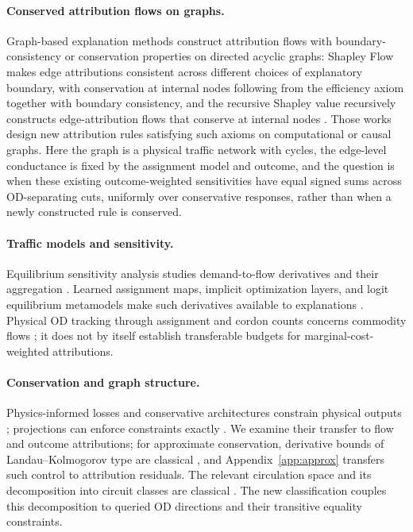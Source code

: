 \documentclass[a4paper,fleqn]{cas-sc}
\begin{document}
\paragraph{Conserved attribution flows on graphs.}
Graph-based explanation methods construct attribution flows with
boundary-consistency or conservation properties on directed acyclic
graphs: Shapley Flow makes edge attributions consistent across
different choices of explanatory boundary, with conservation at
internal nodes following from the efficiency axiom together with
boundary consistency, and the recursive
Shapley value recursively constructs edge-attribution flows that
conserve at internal nodes \citep{wang2021shapleyflow,singal2021rsv}.
Those works design
new attribution rules satisfying such axioms on computational or causal
graphs. Here the graph is a physical traffic network with cycles, the
edge-level conductance is fixed by the assignment model and outcome,
and the question is when these existing outcome-weighted sensitivities
have equal signed sums across OD-separating cuts, uniformly over
conservative responses, rather than when a newly constructed rule is
conserved.

\paragraph{Traffic models and sensitivity.}
Equilibrium sensitivity analysis studies demand-to-flow derivatives and their
aggregation \citep{tobin1988sensitivity,yang2005sensitivity,josefsson2007sensitivity,patriksson2003aggregated}.
Learned assignment maps, implicit optimization layers, and logit equilibrium
metamodels make such derivatives available to explanations
\citep{liu2023endtoend,amos2017optnet,lassen2025learning}.
Physical OD tracking through assignment and cordon counts concerns commodity
flows \citep{sheffi1985urban,vanzuylen1980most,bar2002origin}; it does not by
itself establish transferable budgets for marginal-cost-weighted attributions.

\paragraph{Conservation and graph structure.}
Physics-informed losses and conservative architectures constrain physical
outputs \citep{raissi2019physics,shi2021physics,richterpowell2022neural};
projections can enforce constraints exactly \citep{valente2025physics,baez2024guaranteeing}.
We examine their transfer to flow and outcome attributions; for
approximate conservation, derivative bounds of Landau--Kolmogorov type
are classical \citep{shadrin2014landau}, and
Appendix~\ref{app:approx} transfers such control to attribution
residuals. The relevant
circulation space and its decomposition into circuit classes are classical
\citep{oxley2011matroid,hopcroft1973algorithm}. The new classification couples
this decomposition to queried OD directions and their transitive equality
constraints.
\end{document}

